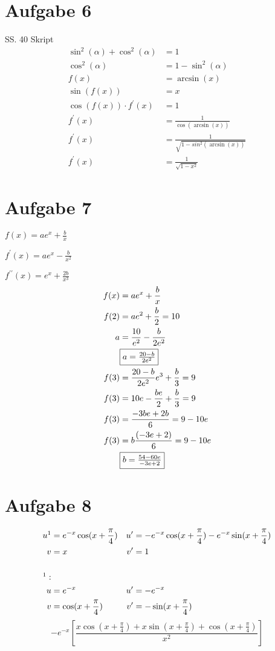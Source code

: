 \documentclass[a4paper, ngerman]{scrartcl}
\begin{document}
	\section*{Aufgabe 6}
	SS. 40 Skript
	\begin{align*}
		\sin^2(\alpha) + \cos^2(\alpha) &= 1\\
		\cos^2(\alpha) &= 1 - \sin^2(\alpha)\\
		f(x) &= \arcsin(x)\\
		\sin(f(x)) &= x\\
		\cos(f(x)) \cdot f^\prime(x) &= 1\\
		f^\prime(x) &= \frac{1}{\cos(\arcsin(x))}\\
		f^\prime(x) &= \frac{1}{\sqrt{1-sin^2(\arcsin(x))}}\\
		f^\prime(x) &= \frac{1}{\sqrt{1-x^2}}
	\end{align*}
	\newpage
	\section*{Aufgabe 7}
	\quad $f(x) = ae^x+\frac{b}{x}$
	
	$f^\prime(x) = ae^{x} - \frac{b}{x^{2}}$
	
	$f^{\prime\prime}(x) = e^{x} + \frac{2b}{x^{3}}$
	\begin{align*}
		f(x) &= ae^x+\frac{b}{x}\\
		f(2) &= ae^2 + \frac{b}{2} = 10\\
		a &= \frac{10}{e^2}-\frac{b}{2e^2}\\
		& \fbox{$a = \frac{20-b}{2e^2}$}\\
		f(3) &= \frac{20-b}{2e^2}e^3+\frac{b}{3} = 9\\
		f(3) &= 10e-\frac{be}{2}+\frac{b}{3} = 9\\
		f(3) &= \frac{-3be+2b}{6} = 9-10e\\
		f(3) &= b\frac{(-3e+2)}{6} = 9-10e\\
		& \fbox{$b = \frac{54-60e}{-3e+2}$}\\
	\end{align*}

	\section*{Aufgabe 8}
	\begin{align*}
		u\footnotemark &= e^{-x}\cos(x+\frac{\pi}{4}) &u^\prime&= -e^{-x}\cos(x+\frac{\pi}{4})-e^{-x}\sin(x+\frac{\pi}{4})\\
		v &= x & v^\prime &= 1\\
		\\
		\footnotemark[1]:\\
		u &=e^{-x} & u^\prime &= -e^{-x}\\
		v &= \cos(x+\frac{\pi}{4}) & v^\prime &=-\sin(x+\frac{\pi}{4})\\
	\end{align*}	
		$$-e^{-x}\left[\frac{x\cos(x+\frac{\pi}{4}) + x\sin(x+\frac{\pi}{4}) + \cos(x+\frac{\pi}{4})}{x^2}\right]$$
		
\end{document}
